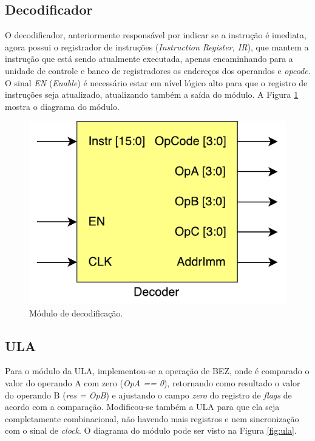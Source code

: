 \documentclass[11pt,a4paper,titlepage]{article}
\begin{document}
\subsection{Decodificador}\label{subsec:imp-decode}

O decodificador, anteriormente responsável por indicar se a instrução é imediata, agora possui o registrador de instruções (\textit{Instruction Register, IR}), que mantem a instrução que está sendo atualmente executada, apenas encaminhando para a unidade de controle e banco de registradores os endereços dos operandos e \textit{opcode}. O sinal \textit{EN} (\textit{Enable}) é necessário estar em nível lógico alto para que o registro de instruções seja atualizado, atualizando também a saída do módulo. A Figura \ref{fig:decoder} mostra o diagrama do módulo.

\begin{figure}[!h]
\centering
\includegraphics[scale=0.5]{images/Decoder.pdf}
\caption{Módulo de decodificação.}
\label{fig:decoder}
\end{figure}

\subsection{ULA}\label{subsec:imp-ula}

Para o módulo da ULA, implementou-se a operação de BEZ, onde é comparado o valor do operando A com zero (\textit{OpA == 0}), retornando como resultado o valor do operando B (\textit{res = OpB}) e ajustando o campo \textit{zero} do registro de \textit{flags} de acordo com a comparação. Modificou-se também a ULA para que ela seja completamente combinacional, não havendo mais registros e nem sincronização com o sinal de \textit{clock}. O diagrama do módulo pode ser visto na Figura \ref{fig:ula}.
\end{document}
